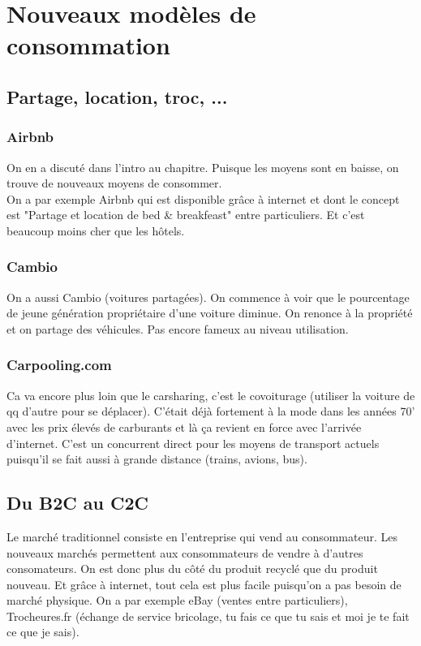 \section{Nouveaux modèles de consommation}
\subsection{Partage, location, troc, ...}
\subsubsection{Airbnb}
On en a discuté dans l'intro au chapitre. Puisque les moyens sont en baisse, on trouve de nouveaux moyens de consommer. \\
On a par exemple Airbnb qui est disponible grâce à internet et dont le concept est "Partage et location de bed \& breakfeast" entre particuliers. Et c’est beaucoup moins cher que les hôtels. 

\subsubsection{Cambio}
On a aussi Cambio (voitures partagées). On commence à voir que le pourcentage de jeune génération propriétaire d’une voiture diminue. On renonce à la propriété et on partage des véhicules. Pas encore fameux au niveau utilisation.

\subsubsection{Carpooling.com}
Ca va encore plus loin que le carsharing, c’est le covoiturage (utiliser la voiture de qq d’autre pour se déplacer). C'était déjà fortement à la mode dans les années 70' avec les prix élevés de carburants et là ça revient en force avec l'arrivée d'internet. C'est un concurrent direct pour les moyens de transport actuels puisqu'il se fait aussi à grande distance (trains, avions, bus).

\subsection{Du B2C au C2C}
Le marché traditionnel consiste en l’entreprise qui vend au consommateur. Les nouveaux marchés permettent aux consommateurs de vendre à d'autres consomateurs. On est donc plus du côté du produit recyclé que du produit nouveau. Et grâce à internet, tout cela est plus facile puisqu'on a pas besoin de marché physique. On a par exemple eBay (ventes entre particuliers), Trocheures.fr (échange de service bricolage, tu fais ce que tu sais et moi je te fait ce que je sais).

